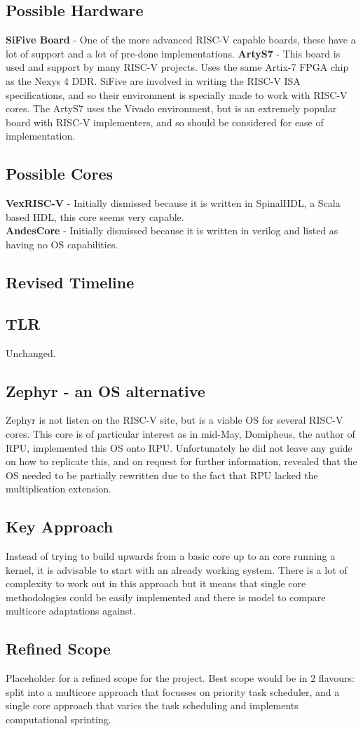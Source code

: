 	\subsection{Possible Hardware}
	\textbf{SiFive Board} - One of the more advanced RISC-V capable boards, these have a lot of support and a lot of pre-done implementations.
	\textbf{ArtyS7} - This board is used and support by many RISC-V projects. Uses the same Artix-7 FPGA chip as the Nexys 4 DDR.
	SiFive are involved in writing the RISC-V ISA specifications, and so their environment is specially made to work with RISC-V cores. The ArtyS7 uses the Vivado environment, but is an extremely popular board with RISC-V implementers, and so should be considered for ease of implementation.
	
	\subsection{Possible Cores}
	\textbf{VexRISC-V} - Initially dismissed because it is written in SpinalHDL, a Scala based HDL, this core seems very capable.\\
	\textbf{AndesCore} - Initially dismissed because it is written in verilog and listed as having no OS capabilities.
	
	\subsection{Revised Timeline}
	
	\subsection{TLR}
	Unchanged.
	
	\subsection{Zephyr - an OS alternative}
	Zephyr is not listen on the RISC-V site, but is a viable OS for several RISC-V cores. This core is of particular interest as in mid-May, Domipheus, the author of RPU, implemented this OS onto RPU. Unfortunately he did not leave any guide on how to replicate this, and on request for further information, revealed that the OS needed to be partially rewritten due to the fact that RPU lacked the multiplication extension. 
	
	\subsection{Key Approach}
	Instead of trying to build upwards from a basic core up to an core running a kernel, it is advisable to start with an already working system. There is a lot of complexity to work out in this approach but it means that single core methodologies could be easily implemented and there is model to compare multicore adaptations against.
	
	\subsection{Refined Scope}
	Placeholder for a refined scope for the project. Best scope would be in 2 flavours: split into a multicore approach that focusses on priority task scheduler, and a single core approach that varies the task scheduling and implements computational sprinting. 
		